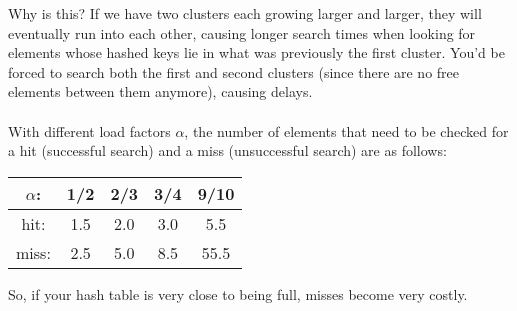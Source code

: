 \documentclass[]{article}
\theoremstyle{definition}
\begin{document}
				Why is this? If we have two clusters each growing larger and larger, they will eventually run into each other, causing longer search times when looking for elements whose hashed keys lie in what was previously the first cluster. You'd be forced to search both the first and second clusters (since there are no free elements between them anymore), causing delays.
				\\ \\
				With different load factors $\alpha$, the number of elements that need to be checked for a hit (successful search) and a miss (unsuccessful search) are as follows:
				\begin{center}
					\begin{tabular}{c|c|c|c|c}
						$\alpha$: & 1/2 & 2/3 & 3/4 & 9/10 \\ \hline
						hit: & 1.5 & 2.0 & 3.0 & 5.5 \\
						miss: & 2.5 & 5.0 & 8.5 & 55.5
					\end{tabular}
				\end{center}

				So, if your hash table is very close to being full, misses become very costly.
\end{document}

